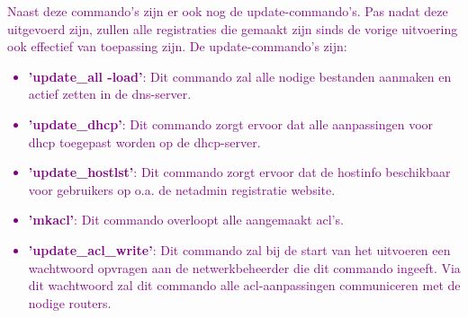 \textcolor{purple}{Naast deze commando's zijn er ook nog de update-commando's. Pas nadat deze uitgevoerd zijn, zullen alle registraties die gemaakt zijn sinds de vorige uitvoering ook effectief van toepassing zijn. De update-commando's zijn:}
\textcolor{purple}{
    \begin{itemize}
        \item \textbf{'update\_all -load'}: Dit commando zal alle nodige bestanden aanmaken en actief zetten in de \acrshort{dns}-server.
        \item \textbf{'update\_dhcp'}: Dit commando zorgt ervoor dat alle aanpassingen voor \acrshort{dhcp} toegepast worden op de \acrshort{dhcp}-server.
        \item \textbf{'update\_hostlst'}: Dit commando zorgt ervoor dat de hostinfo beschikbaar voor gebruikers op o.a. de netadmin registratie website.
        \item \textbf{'mkacl'}: Dit commando overloopt alle aangemaakt \acrshort{acl}'s.
        \item \textbf{'update\_acl\_write'}: Dit commando zal bij de start van het uitvoeren een wachtwoord opvragen aan de netwerkbeheerder die dit commando ingeeft. Via dit wachtwoord zal dit commando alle \acrshort{acl}-aanpassingen communiceren met de nodige routers.
    \end{itemize}
}
